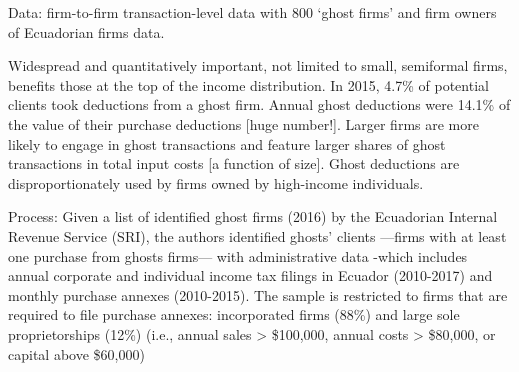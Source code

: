 \documentclass[
  12pt]{article}
\theoremstyle{definition}
\theoremstyle{remark}
\begin{document}
Data: firm-to-firm transaction-level data with 800 `ghost firms' and
firm owners of Ecuadorian firms data.

Widespread and quantitatively important, not limited to small,
semiformal firms, benefits those at the top of the income distribution.
In 2015, 4.7\% of potential clients took deductions from a ghost firm.
Annual ghost deductions were 14.1\% of the value of their purchase
deductions {[}huge number!{]}. Larger firms are more likely to engage in
ghost transactions and feature larger shares of ghost transactions in
total input costs {[}a function of size{]}. Ghost deductions are
disproportionately used by firms owned by high-income individuals.

Process: Given a list of identified ghost firms (2016) by the Ecuadorian
Internal Revenue Service (SRI), the authors identified ghosts' clients
---firms with at least one purchase from ghosts firms--- with
administrative data -which includes annual corporate and individual
income tax filings in Ecuador (2010-2017) and monthly purchase annexes
(2010-2015). The sample is restricted to firms that are required to file
purchase annexes: incorporated firms (88\%) and large sole
proprietorships (12\%) (i.e., annual sales \textgreater{} \$100,000,
annual costs \textgreater{} \$80,000, or capital above \$60,000)
\end{document}

